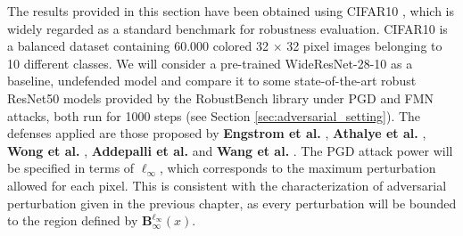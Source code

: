 \begin{experiment}
The results provided in this section have been obtained using CIFAR10
\cite{krizhevskyLearningMultipleLayers},
which is widely regarded as a standard benchmark for robustness evaluation. CIFAR10 is
a balanced dataset containing 60.000 colored 32 $\times$ 32 pixel images belonging to 10
different classes. We will consider a pre-trained WideResNet-28-10
\cite{BMVC2016_87}
as a baseline, undefended model and compare it to some state-of-the-art robust ResNet50
\cite{resnet50}
models provided by the 
RobustBench \cite{croceRobustBenchStandardizedAdversarial2021a}
library under PGD \cite{madryDeepLearningModels2019}
and FMN \cite{pintorFastMinimumnormAdversarial2021}
attacks, both run for 1000 steps (see Section \ref{sec:adversarial_setting}).
The defenses applied are those proposed by 
{\color{tab:blue} \textbf{Engstrom et al.}} \cite{engstrom2019adversarial}, 
{\color{tab:green} \textbf{Athalye et al.}} \cite{AthalyeC018}, 
{\color{tab:red} \textbf{Wong et al.}} \cite{WongRK20}, 
{\color{tab:purple} \textbf{Addepalli et al.}} \cite{Addepalli2022ScalingAT}
and {\color{tab:brown} \textbf{Wang et al.}} \cite{wang2023betterdiffusionmodelsimprove}.
The PGD attack power will be specified in terms of $\ell_\infty$, which corresponds
to the maximum perturbation allowed for each pixel. This is consistent with the characterization
of adversarial perturbation given in the previous chapter, as every perturbation will be bounded
to the region defined by $\mathbf{B}_\infty^{\ell_{\infty}} (x)$.
\end{experiment}

